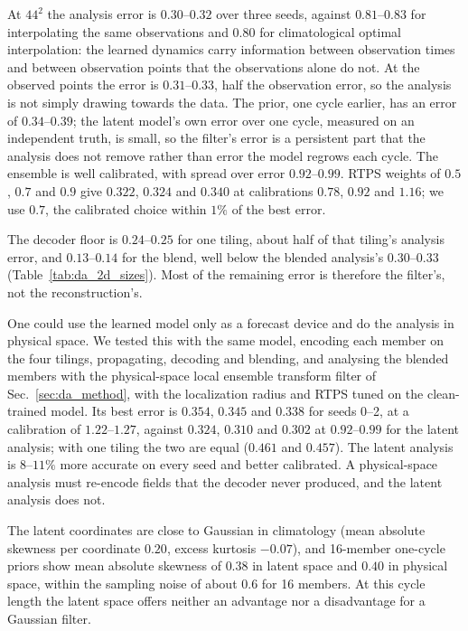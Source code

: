 At $44^2$ the analysis error is $0.30$--$0.32$ over three seeds, against $0.81$--$0.83$
for interpolating the same observations and $0.80$ for climatological
optimal interpolation: the learned dynamics carry information between
observation times and between observation points that the observations
alone do not. At the observed points the error is $0.31$--$0.33$, half the
observation error, so the analysis is not simply drawing towards the
data. The prior, one cycle earlier, has an error of $0.34$--$0.39$; the
latent model's own error over one cycle, measured on an independent
truth, is small, so the filter's error is a persistent part that the
analysis does not remove rather than error the model regrows each cycle.
The ensemble is well calibrated, with spread over error $0.92$--$0.99$.
RTPS weights of $0.5$, $0.7$ and $0.9$ give $0.322$, $0.324$ and $0.340$ at
calibrations $0.78$, $0.92$ and $1.16$; we use $0.7$, the calibrated choice
within $1\%$ of the best error.

 The decoder floor is $0.24$--$0.25$ for one
tiling, about half of that tiling's analysis error, and $0.13$--$0.14$ for the
blend, well below the blended analysis's $0.30$--$0.33$
(Table~\ref{tab:da_2d_sizes}). Most of the remaining error is therefore
the filter's, not the reconstruction's.

 One could use the learned
model only as a forecast device and do the analysis in physical space.
We tested this with the same model, encoding each member on the four
tilings, propagating, decoding and blending, and analysing the blended
members with the physical-space local ensemble transform filter of
Sec.~\ref{sec:da_method}, with the localization radius and RTPS tuned on the
clean-trained model.
Its best error is $0.354$, $0.345$ and $0.338$ for seeds 0--2, at a calibration of
$1.22$--$1.27$, against $0.324$, $0.310$ and $0.302$ at $0.92$--$0.99$ for the latent
analysis; with one tiling the two are equal ($0.461$ and $0.457$). The latent
analysis is $8$--$11\%$ more accurate on every seed and better calibrated.
A physical-space analysis must re-encode fields that the decoder never
produced, and the latent analysis does not.

 The latent coordinates are close to Gaussian in
climatology (mean absolute skewness per coordinate $0.20$, excess kurtosis
$-0.07$), and 16-member one-cycle priors show mean absolute skewness of $0.38$ in
latent space and $0.40$ in physical space, within the sampling noise of about $0.6$
for 16 members. At this cycle length the latent space offers neither an
advantage nor a disadvantage for a Gaussian filter.

